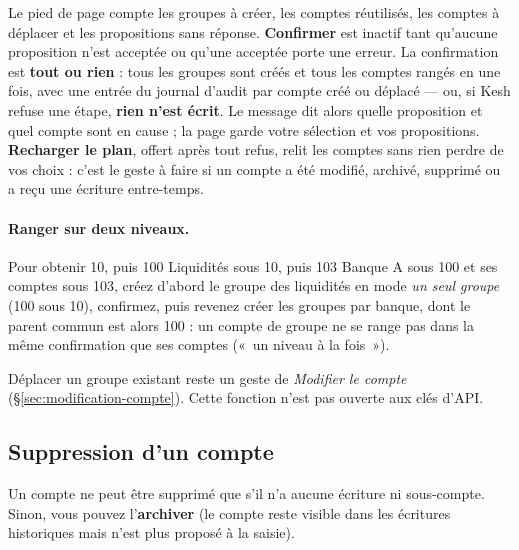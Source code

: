 \documentclass[a4paper,11pt,oneside]{article}
\begin{document}
Le pied de page compte les groupes à créer, les comptes réutilisés, les comptes à déplacer et les
propositions sans réponse. \textbf{Confirmer} est inactif tant qu'aucune proposition n'est acceptée
ou qu'une acceptée porte une erreur. La confirmation est \textbf{tout ou rien} : tous les groupes
sont créés et tous les comptes rangés en une fois, avec une entrée du journal d'audit par compte
créé ou déplacé --- ou, si Kesh refuse une étape, \textbf{rien n'est écrit}. Le message dit alors
quelle proposition et quel compte sont en cause ; la page garde votre sélection et vos
propositions. \textbf{Recharger le plan}, offert après tout refus, relit les comptes sans rien perdre
de vos choix : c'est le geste à faire si un compte a été modifié, archivé, supprimé ou a reçu une
écriture entre-temps.

\paragraph{Ranger sur deux niveaux.} Pour obtenir 10, puis 100 Liquidités sous 10, puis 103 Banque A sous 100 et ses comptes sous 103,
créez d'abord le groupe des liquidités en mode \emph{un seul groupe} (100 sous 10), confirmez,
puis revenez créer les groupes par banque, dont le parent commun est alors 100 : un compte de
groupe ne se range pas dans la même confirmation que ses comptes («~un niveau à la fois~»).

Déplacer un groupe existant reste un geste de \emph{Modifier le compte}
(\S\ref{sec:modification-compte}). Cette fonction n'est pas ouverte aux clés d'API.

\subsection{Suppression d'un compte}

Un compte ne peut être supprimé que s'il n'a aucune écriture ni sous-compte. Sinon, vous pouvez l'\textbf{archiver} (le compte reste visible dans les écritures historiques mais n'est plus proposé à la saisie).
\end{document}
